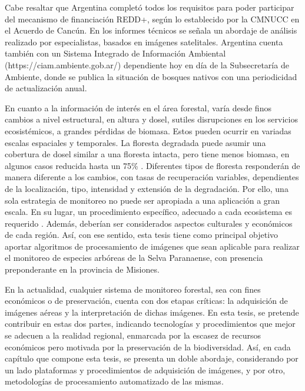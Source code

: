 Cabe resaltar que Argentina completó todos los requisitos para poder participar del mecanismo de financiación REDD+, según lo establecido por la CMNUCC en el Acuerdo de Cancún. En los informes técnicos se señala un abordaje de análisis realizado por especialistas, basados en imágenes satelitales. Argentina cuenta también con un Sistema Integrado de Información Ambiental (https://ciam.ambiente.gob.ar/) dependiente hoy en día de la Subsecretaría de Ambiente, donde se publica la situación de bosques nativos con una periodicidad de actualización anual.

En cuanto a la información de interés en el área forestal, varía desde finos cambios a nivel estructural, en altura y dosel, sutiles disrupciones en los servicios ecosistémicos, a grandes pérdidas de biomasa. Estos pueden ocurrir en variadas escalas espaciales y temporales. La floresta degradada puede asumir una cobertura de dosel similar a una floresta intacta, pero tiene menos biomasa, en algunos casos reducida hasta un 75\% \cite{change_report_2006}. Diferentes tipos de floresta responderán de manera diferente a los cambios, con tasas de recuperación variables, dependientes de la localización, tipo, intensidad y extensión de la degradación. Por ello, una sola estrategia de monitoreo no puede ser apropiada a una aplicación a gran escala. En su lugar, un procedimiento específico, adecuado a cada ecosistema es requerido \cite{mitchell_current_2017}. Además, deberían ser considerados aspectos culturales y económicos de cada región. Así, con ese sentido, esta tesis tiene como principal objetivo aportar algoritmos de procesamiento de imágenes que sean aplicable para realizar el monitoreo de especies arbóreas de la Selva Paranaense, con presencia preponderante en la provincia de Misiones.

En la actualidad, cualquier sistema de monitoreo forestal, sea con fines económicos o de preservación, cuenta con dos etapas críticas: la adquisición de imágenes aéreas y la interpretación de dichas imágenes. En esta tesis, se pretende contribuir en estas dos partes, indicando tecnologías y procedimientos que mejor se adecuen a la realidad regional, enmarcada por la escasez de recursos económicos pero motivada por la preservación de la biodiversidad. Así, en cada capítulo que compone esta tesis, se presenta un doble abordaje, considerando por un lado plataformas y  procedimientos de adquisición de imágenes, y por otro, metodologías de procesamiento automatizado de las mismas.
